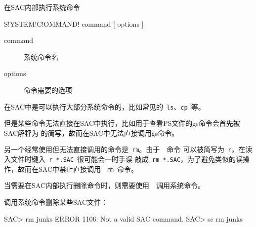 \label{cmd:systemcommand}

在SAC内部执行系统命令

\begin{SACSTX}
S!YSTEM!C!OMMAND! command [ options ]
\end{SACSTX}

\begin{description}
\item [command] 系统命令名
\item [options] 命令需要的选项
\end{description}

在SAC中是可以执行大部分系统命令的，比如常见的~\lstinline{ls}、\lstinline{cp}~等。

但是某些命令无法直接在SAC中执行，比如用于查看PS文件的gs命令会首先被SAC解释为
的简写，故而在SAC中无法直接调用gs命令。

另一个经常使用但无法直接调用的命令是~\lstinline{rm}。由于~~命令
可以被简写为~\lstinline{r}，在读入文件时键入~\lstinline{r *.SAC}~很可能会一时手误
敲成~\lstinline{rm *.SAC}，为了避免类似的误操作，故而在SAC中禁止直接调用
~\lstinline{rm}~命令。

当需要在SAC内部执行删除命令时，则需要使用~~调用系统命令。

调用系统命令删除某些SAC文件：
\begin{SACCode}
SAC> rm junks
 ERROR 1106: Not a valid SAC command.
SAC> sc rm junks
\end{SACCode}
